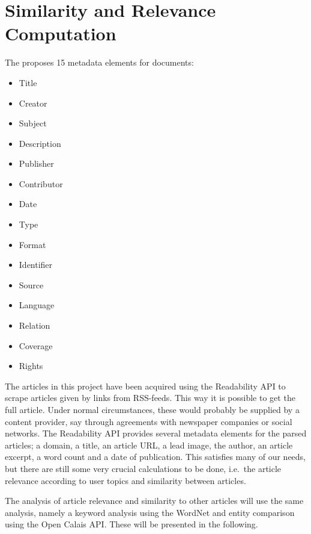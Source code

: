 \section{Similarity and Relevance {Computation}}
The \cite{DCMI} proposes 15 metadata elements for documents:
\begin{itemize}\itemdist
	\item Title
	\item Creator
	\item Subject
	\item Description
	\item Publisher
	\item Contributor
	\item Date
	\item Type
	\item Format
	\item Identifier
	\item Source
	\item Language
	\item Relation
	\item Coverage
	\item Rights
\end{itemize}
The articles in this project have been acquired using the Readability API to scrape articles given by links from RSS-feeds. This way it is possible to get the full article. Under normal circumstances, these would probably be supplied by a content provider, say through agreements with newspaper companies or social networks. The Readability API provides several metadata elements for the parsed articles; a domain, a title, an article URL, a lead image, the author, an article excerpt, a word count and a date of publication. This satisfies many of our needs, but there are still some very crucial calculations to be done, i.e.\ the article relevance according to user topics and similarity between articles.

The analysis of article relevance and similarity to other articles will use the same analysis, namely a keyword analysis using the WordNet and entity comparison using the Open Calais API. These will be presented in the following.

